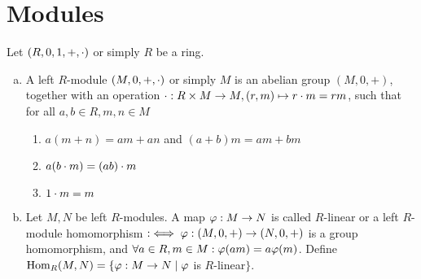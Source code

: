 \documentclass[a4paper]{report}
\begin{document}
\section{Modules}
Let $(R, 0, 1, +, \cdot)$ or simply $R$ be a ring.
\begin{defi}
\begin{enumerate}[(a)]
        \item A left $R$-module $(M, 0, +, \cdot)$ or simply $M$ is an abelian group $(M, 0, +)$, together with an operation $\cdot: R \times M \to M, (r,m) \mapsto r \cdot m = rm$, such that for all $a, b \in R, m, n \in M$
        \begin{enumerate}[(M1)]
          \item $a(m+n) = am+an$ and $(a+b)m = am + bm$
          \item $a(b \cdot m) = (ab) \cdot m$
                \item $1 \cdot m = m$
        \end{enumerate}
  \item Let $M, N$ be left $R$-modules. A map $\varphi : M \to N$ is called $R$-linear or a left $R$-module homomorphism $:\iff \varphi: (M, 0, +) \to (N,0,+)$ is a group homomorphism, and $\forall a \in R, m \in M : \varphi(am) = a\varphi(m)$. Define $\operatorname{Hom}_{R}(M,N) = \{\varphi: M \to N \mid \varphi$ is $R$-linear$\}$.
\end{enumerate}
\end{defi}
\end{document}
